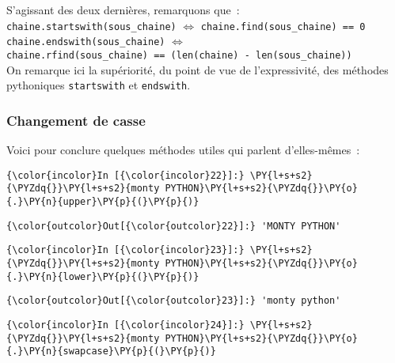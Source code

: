     S'agissant des deux dernières, remarquons que~:\\

    \texttt{chaine.startswith(sous\_chaine)} \(\Longleftrightarrow\)
\texttt{chaine.find(sous\_chaine)\ ==\ 0}\\

\texttt{chaine.endswith(sous\_chaine)} \(\Longleftrightarrow\)
\texttt{chaine.rfind(sous\_chaine)\ ==\ (len(chaine)\ -\ len(sous\_chaine))}\\

    On remarque ici la supériorité, du point de vue de l'expressivité, des
méthodes pythoniques \texttt{startswith} et \texttt{endswith}.

    \hypertarget{changement-de-casse}{%
\subsubsection{Changement de casse}\label{changement-de-casse}}

    Voici pour conclure quelques méthodes utiles qui parlent d'elles-mêmes~:

    \begin{Verbatim}[commandchars=\\\{\}]
{\color{incolor}In [{\color{incolor}22}]:} \PY{l+s+s2}{\PYZdq{}}\PY{l+s+s2}{monty PYTHON}\PY{l+s+s2}{\PYZdq{}}\PY{o}{.}\PY{n}{upper}\PY{p}{(}\PY{p}{)}
\end{Verbatim}


\begin{Verbatim}[commandchars=\\\{\}]
{\color{outcolor}Out[{\color{outcolor}22}]:} 'MONTY PYTHON'
\end{Verbatim}
            
    \begin{Verbatim}[commandchars=\\\{\}]
{\color{incolor}In [{\color{incolor}23}]:} \PY{l+s+s2}{\PYZdq{}}\PY{l+s+s2}{monty PYTHON}\PY{l+s+s2}{\PYZdq{}}\PY{o}{.}\PY{n}{lower}\PY{p}{(}\PY{p}{)}
\end{Verbatim}


\begin{Verbatim}[commandchars=\\\{\}]
{\color{outcolor}Out[{\color{outcolor}23}]:} 'monty python'
\end{Verbatim}
            
    \begin{Verbatim}[commandchars=\\\{\}]
{\color{incolor}In [{\color{incolor}24}]:} \PY{l+s+s2}{\PYZdq{}}\PY{l+s+s2}{monty PYTHON}\PY{l+s+s2}{\PYZdq{}}\PY{o}{.}\PY{n}{swapcase}\PY{p}{(}\PY{p}{)}
\end{Verbatim}



